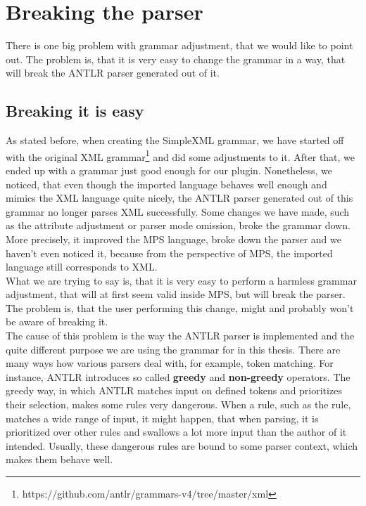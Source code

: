 \section{Breaking the parser}
\label{chap:breaking_the_parser}

There is one big problem with grammar adjustment, that we would like to point out.
The problem is, that it is very easy to change the grammar in a way, that will break the ANTLR parser generated out of it.

\subsection{Breaking it is easy}

As stated before, when creating the SimpleXML grammar, we have started off with the original XML grammar\footnote{https://github.com/antlr/grammars-v4/tree/master/xml} and did some adjustments to it.
After that, we ended up with a grammar just good enough for our plugin.
Nonetheless, we noticed, that even though the imported language behaves well enough and mimics the XML language quite nicely, the ANTLR parser generated out of this grammar no longer parses XML successfully.
Some changes we have made, such as the attribute adjustment or parser mode omission, broke the grammar down.
More precisely, it improved the MPS language, broke down the parser and we haven't even noticed it, because from the perspective of MPS, the imported language still corresponds to XML.
\\

What we are trying to say is, that it is very easy to perform a harmless grammar adjustment, that will at first seem valid inside MPS, but will break the parser.
The problem is, that the user performing this change, might and probably won't be aware of breaking it.
\\

The cause of this problem is the way the ANTLR parser is implemented and the quite different purpose we are using the grammar for in this thesis.
There are many ways how various parsers deal with, for example, token matching.
For instance, ANTLR introduces so called \textbf{greedy} and \textbf{non-greedy} operators.
The greedy way, in which ANTLR matches input on defined tokens and prioritizes their selection, makes some rules very dangerous.
When a rule, such as the  rule, matches a wide range of input, it might happen, that when parsing, it is prioritized over other rules and swallows a lot more input than the author of it intended.
Usually, these dangerous rules are bound to some parser context, which makes them behave well.

